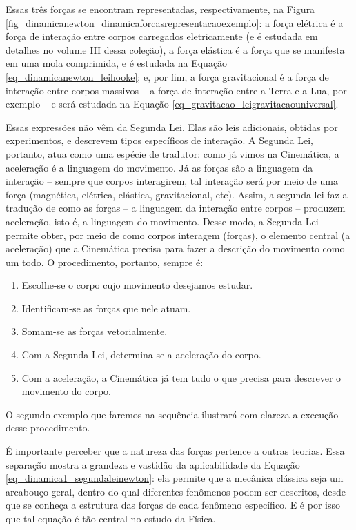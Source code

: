 Essas três forças se encontram representadas, respectivamente, na Figura \ref{fig_dinamicanewton_dinamicaforcasrepresentacaoexemplo}: a força elétrica é a força de interação entre corpos carregados eletricamente (e é estudada em detalhes no volume III dessa coleção), a força elástica é a força que se manifesta em uma mola comprimida, e é estudada na Equação \eqref{eq_dinamicanewton_leihooke}; e, por fim, a força gravitacional é a força de interação entre corpos massivos -- a força de interação entre a Terra e a Lua, por exemplo -- e será estudada na Equação \eqref{eq_gravitacao_leigravitacaouniversal}.

Essas expressões não vêm da Segunda Lei. Elas são leis adicionais, obtidas por experimentos, e descrevem tipos específicos de interação. A Segunda Lei, portanto, atua como uma espécie de tradutor: como já vimos na Cinemática, a aceleração é a linguagem do movimento. Já as forças são a linguagem da interação -- sempre que corpos interagirem, tal interação será por meio de uma força (magnética, elétrica, elástica, gravitacional, etc). Assim, a segunda lei faz a tradução de como as forças -- a linguagem da interação entre corpos -- produzem aceleração, isto é, a linguagem do movimento. Desse modo, a Segunda Lei permite obter, por meio de como corpos interagem (forças), o elemento central (a aceleração) que a Cinemática precisa para fazer a descrição do movimento como um todo. O procedimento, portanto, sempre é:

\begin{enumerate}
\item  Escolhe-se o corpo cujo movimento desejamos estudar.
\item  Identificam-se as forças que nele atuam.
\item  Somam-se as forças vetorialmente.
\item  Com a Segunda Lei, determina-se a aceleração do corpo.
\item  Com a aceleração, a Cinemática já tem tudo o que precisa para descrever o movimento do corpo.
\end{enumerate}


O segundo exemplo que faremos na sequência ilustrará com clareza a execução desse procedimento.


É importante perceber que a natureza das forças pertence a outras teorias. Essa separação mostra a grandeza e vastidão da aplicabilidade da Equação \eqref{eq_dinamica1_segundaleinewton}: ela permite que a mecânica clássica seja um arcabouço geral, dentro do qual diferentes fenômenos podem ser descritos, desde que se conheça a estrutura das forças de cada fenômeno específico. E é por isso que tal equação é tão central no estudo da Física.



